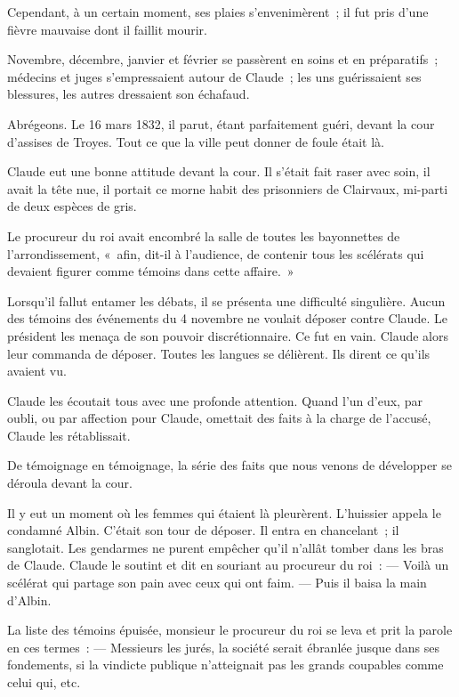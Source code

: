 \documentclass[french,twoside]{book} %
\begin{document}
Cependant, à un certain moment, ses plaies s’envenimèrent ; il fut pris d’une fièvre mauvaise dont il faillit mourir.\par
Novembre, décembre, janvier et février se passèrent en soins et en préparatifs ; médecins et juges s’empressaient autour de Claude ; les uns guérissaient ses blessures, les autres dressaient son échafaud.\par
Abrégeons. Le 16 mars 1832, il parut, étant  parfaitement guéri, devant la cour d’assises de Troyes. Tout ce que la ville peut donner de foule était là.\par
Claude eut une bonne attitude devant la cour. Il s’était fait raser avec soin, il avait la tête nue, il portait ce morne habit des prisonniers de Clairvaux, mi-parti de deux espèces de gris.\par
Le procureur du roi avait encombré la salle de toutes les bayonnettes de l’arrondissement, « afin, dit-il à l’audience, de contenir tous les scélérats qui devaient figurer comme témoins dans cette affaire. »\par
Lorsqu’il fallut entamer les débats, il se présenta une difficulté singulière. Aucun des témoins des événements du 4 novembre ne voulait déposer contre Claude. Le président les menaça de son pouvoir discrétionnaire. Ce fut en vain. Claude alors leur commanda de déposer. Toutes les langues se délièrent. Ils dirent ce qu’ils avaient vu.\par
Claude les écoutait tous avec une profonde attention. Quand l’un d’eux, par oubli, ou par affection pour Claude, omettait des faits à la charge de l’accusé, Claude les rétablissait.\par
De témoignage en témoignage, la série des faits que nous venons de développer se déroula devant la cour.\par
Il y eut un moment où les femmes qui étaient là pleurèrent. L’huissier appela le condamné Albin. C’était son tour de déposer. Il entra en chancelant ; il sanglotait. Les gendarmes ne purent empêcher qu’il n’allât tomber dans les bras de Claude. Claude le soutint et dit en souriant au procureur du roi : — Voilà un  scélérat qui partage son pain avec ceux qui ont faim. — Puis il baisa la main d’Albin.\par
La liste des témoins épuisée, monsieur le procureur du roi se leva et prit la parole en ces termes : — Messieurs les jurés, la société serait ébranlée jusque dans ses fondements, si la vindicte publique n’atteignait pas les grands coupables comme celui qui, etc.\par
\end{document}
